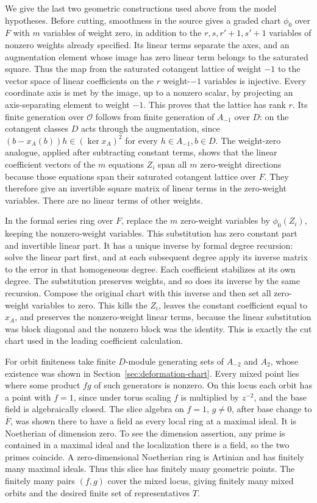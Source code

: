 We give the last two geometric constructions used above from the
model hypotheses. Before cutting, smoothness in the source gives
a graded chart \(\phi_0\) over \(F\) with \(m\) variables of weight
zero, in addition to the \(r,s,r'+1,s'+1\) variables of nonzero
weights already specified. Its linear terms separate the axes, and
an augmentation element whose image has zero linear term belongs
to the saturated square. Thus the map from the saturated cotangent
lattice of weight \(-1\) to the vector space of linear coefficients
on the \(r\) weight-\(-1\) variables is injective. Every coordinate
axis is met by the image, up to a nonzero scalar, by projecting an
axis-separating element to weight \(-1\). This proves that the
lattice has rank \(r\). Its finite generation over \(\mathcal O\)
follows from finite generation of \(A_{-1}\) over \(D\): on the
cotangent classes \(D\) acts through the augmentation, since
\((b-x_A(b))h\in(\ker x_A)^2\) for every \(h\in A_{-1}, b\in D\).
The weight-zero analogue, applied after subtracting constant terms,
shows that the linear coefficient vectors of the \(m\) equations
\(Z_i\) span all \(m\) zero-weight directions because those equations
span their saturated cotangent lattice over \(F\). They therefore
give an invertible square matrix of linear terms in the zero-weight
variables. There are no linear terms of other weights.

In the formal series ring over \(F\), replace the \(m\) zero-weight
variables by \(\phi_0(Z_i)\), keeping the nonzero-weight variables.
This substitution has zero constant part and invertible linear part.
It has a unique inverse by formal degree recursion: solve the
linear part first, and at each subsequent degree apply its inverse
matrix to the error in that homogeneous degree. Each coefficient
stabilizes at its own degree. The substitution preserves weights, and
so does its inverse by the same recursion. Compose the original
chart with this inverse and then set all zero-weight variables to
zero. This kills the \(Z_i\), leaves the constant coefficient equal
to \(x_A\), and preserves the nonzero-weight linear terms, because
the linear substitution was block diagonal and the nonzero block
was the identity. This is exactly the cut chart used in the leading
coefficient calculation.

For orbit finiteness take finite \(D\)-module generating sets of
\(A_{-2}\) and \(A_2\), whose existence was shown in
Section~\ref{sec:deformation-chart}. Every mixed point lies where
some product \(fg\) of such generators is nonzero. On this locus
each orbit has a point with \(f=1\), since under torus scaling \(f\) is
multiplied by \(z^{-2}\), and the base field is algebraically closed.
The slice algebra on \(f=1\), \(g\ne0\), after base change to
\(\overline F\), was shown there to have a field as every local ring
at a maximal ideal. It is Noetherian of dimension zero. To see the
dimension assertion, any prime is contained in a maximal ideal and
the localization there is a field, so the two primes coincide.
A zero-dimensional Noetherian ring is Artinian and has finitely many
maximal ideals. Thus this slice has finitely many geometric points.
The finitely many pairs \((f,g)\) cover the mixed locus, giving
finitely many mixed orbits and the desired finite set of
representatives \(T\).

